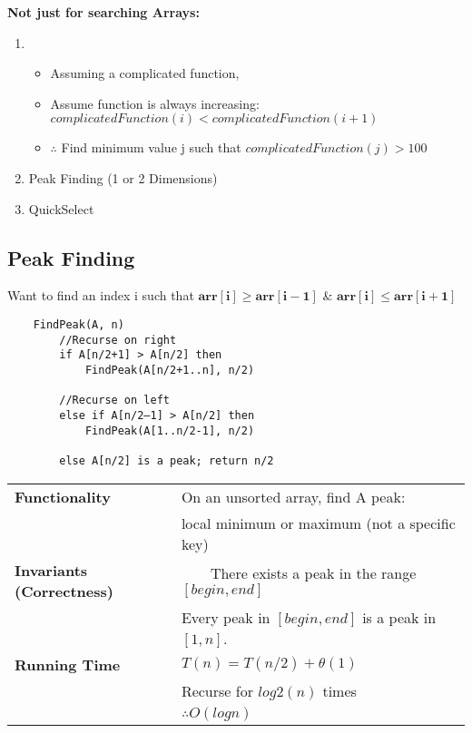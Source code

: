 \documentclass{article}
\newcommand{\tabitem}{~~\llap{\textbullet}~~}
\begin{document}
    \bigskip
    \textbf{Not just for searching Arrays:}
    \begin{enumerate}
        \item \begin{itemize}
            \item Assuming a complicated function,
            \item Assume function is always increasing: $complicatedFunction(i) < complicatedFunction(i+1)$
            \item $\therefore$ Find minimum value j such that $complicatedFunction(j) > 100$
        \end{itemize}

        \item Peak Finding (1 or 2 Dimensions)
        \item QuickSelect
    \end{enumerate}

    \pagebreak

    \subsection{Peak Finding}

    Want to find an index i such that $\bm{arr[i] \geq arr[i-1]}$ \&  $\bm{arr[i] \leq arr[i+1]}$

    \begin{verbatim}
    FindPeak(A, n)
        //Recurse on right
        if A[n/2+1] > A[n/2] then
            FindPeak(A[n/2+1..n], n/2)

        //Recurse on left
        else if A[n/2–1] > A[n/2] then
            FindPeak(A[1..n/2‐1], n/2)

        else A[n/2] is a peak; return n/2

    \end{verbatim}
    
    \begin{tabular}{ll}
        \toprule
        \textbf{Functionality} & On an unsorted array, find A peak: \\
        & local minimum or maximum (not a specific key)\\
        \midrule
        \textbf{Invariants (Correctness)} & \tabitem There exists a peak in the range $[begin, end]$\\
        & Every peak in $[begin, end]$ is a peak in $[1, n]$.\\
        \midrule
        \textbf{Running Time} & $T(n) = T(n/2) + \theta(1)$\\
        & Recurse for $log2(n)$ times\\
        & $\therefore O(logn)$\\
        \bottomrule
    \end{tabular}
\end{document}
